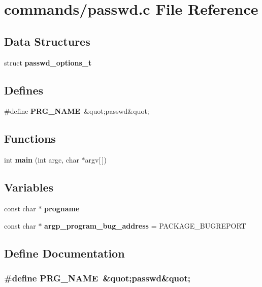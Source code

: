 \section{commands/passwd.c File Reference}
\label{passwd_8c}
\subsection*{Data Structures}
\begin{DoxyCompactItemize}
\item 
struct {\bf passwd\_\-options\_\-t}
\end{DoxyCompactItemize}
\subsection*{Defines}
\begin{DoxyCompactItemize}
\item 
\#define {\bf PRG\_\-NAME}~\&quot;passwd\&quot;
\end{DoxyCompactItemize}
\subsection*{Functions}
\begin{DoxyCompactItemize}
\item 
int {\bf main} (int argc, char $\ast$argv[$\,$])
\end{DoxyCompactItemize}
\subsection*{Variables}
\begin{DoxyCompactItemize}
\item 
const char $\ast$ {\bf progname}
\item 
const char $\ast$ {\bf argp\_\-program\_\-bug\_\-address} = PACKAGE\_\-BUGREPORT
\end{DoxyCompactItemize}


\subsection{Define Documentation}
\subsubsection[{PRG\_\-NAME}]{\setlength{\rightskip}{0pt plus 5cm}\#define PRG\_\-NAME~\&quot;passwd\&quot;}\label{passwd_8c_a3683528b11af231edc6e4e89d5b1b20e}


